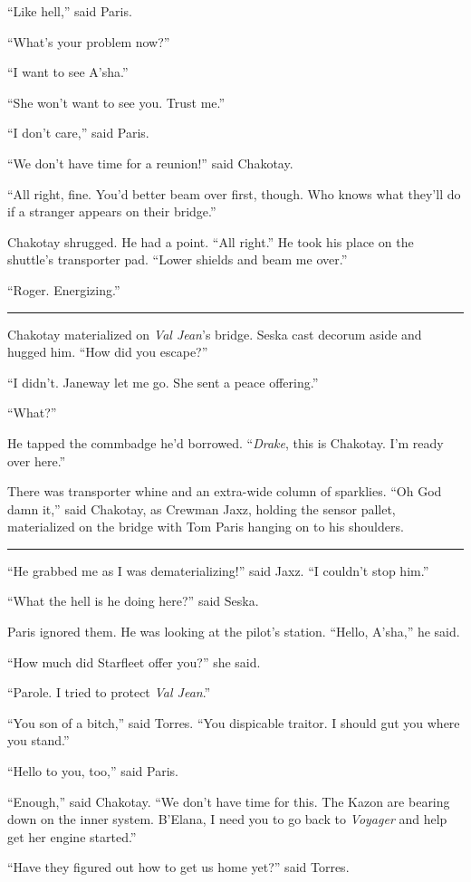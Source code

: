 \documentclass[twoside,letterpaper,12pt]{memoir}
\begin{document}
``Like hell,'' said Paris.

``What's your problem now?''

``I want to see A'sha.''

``She won't want to see you. Trust me.''

``I don't care,'' said Paris.

``We don't have time for a reunion!'' said Chakotay.

``All right, fine. You'd better beam over first, though. Who knows what they'll do if a stranger appears on their bridge.''

Chakotay shrugged. He had a point. ``All right.'' He took his place on the shuttle's transporter pad. ``Lower shields and beam me over.''

``Roger. Energizing.''

\fancybreak{\rule{3cm}{0.4 pt}}
Chakotay materialized on \textit{Val Jean}'s bridge. Seska cast decorum aside and hugged him. ``How did you escape?''

``I didn't. Janeway let me go. She sent a peace offering.''

``What?''

He tapped the commbadge he'd borrowed. ``\textit{Drake}, this is Chakotay. I'm ready over here.''

There was transporter whine and an extra-wide column of sparklies. ``Oh God damn it,'' said Chakotay, as Crewman Jaxz, holding the sensor pallet, materialized on the bridge with Tom Paris hanging on to his shoulders.

\fancybreak{\rule{3cm}{0.4 pt}}
``He grabbed me as I was dematerializing!'' said Jaxz. ``I couldn't stop him.''

``What the hell is he doing here?'' said Seska.

Paris ignored them. He was looking at the pilot’s station. ``Hello, A'sha,'' he said.

``How much did Starfleet offer you?'' she said.

``Parole. I tried to protect \textit{Val Jean}.''

``You son of a bitch,'' said Torres. ``You dispicable traitor. I should gut you where you stand.''

``Hello to you, too,'' said Paris.

``Enough,'' said Chakotay. ``We don't have time for this. The Kazon are bearing down on the inner system. B'Elana, I need you to go back to \textit{Voyager} and help get her engine started.''

``Have they figured out how to get us home yet?'' said Torres.
\end{document}

